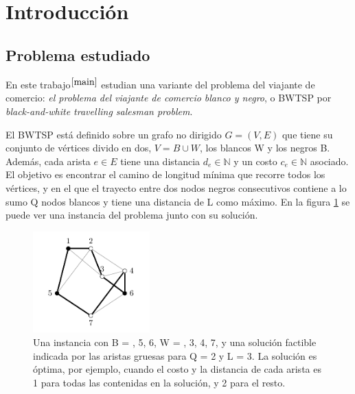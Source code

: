 \documentclass[10pt, a4paper]{article}
\theoremstyle{definition}
\begin{document}




\maketitle

\tableofcontents

\newpage

\section{Introducción}

\subsection{Problema estudiado}
En este trabajo$^{\cite{main}}$ estudian una variante del problema del viajante de comercio: \textit{el problema del viajante de comercio blanco y negro}, o BWTSP por \textit{black-and-white travelling salesman problem}.

El BWTSP está definido sobre un grafo no dirigido $G = (V,E)$ que tiene su conjunto de vértices divido en dos, $V = B \cup W$, los blancos W y los negros B. Además, cada arista $e \in E$ tiene una distancia $d_e \in \mathds{N}$ y un costo $c_e \in \mathds{N}$ asociado. El objetivo es encontrar el camino de longitud mínima que recorre todos los vértices, y en el que el trayecto entre dos nodos negros consecutivos contiene a lo sumo Q nodos blancos y tiene una distancia de L como máximo. En la figura \ref{fig:ejemplo_bwtsp} se puede ver una instancia del problema junto con su solución.

\begin{figure}[H]
    \centering
    \includegraphics[width=0.4\textwidth]{ejemplo_bwtsp.png}
    \caption{Una instancia con B = , 5, 6\textbraceright, W = , 3, 4, 7\textbraceright, y una solución factible indicada por las aristas gruesas para Q = 2 y L = 3. La solución es óptima, por ejemplo, cuando el costo y la distancia de cada arista es 1 para todas las contenidas en la solución, y 2 para el resto.}
    \label{fig:ejemplo_bwtsp}
\end{figure}
\end{document}
